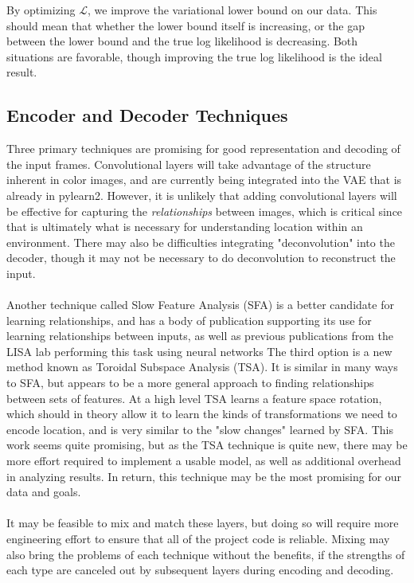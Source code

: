 \documentclass{article}
\begin{document}
 By optimizing $\mathcal{L}$, we improve the variational lower bound on our
 data. This should mean that whether the lower bound itself is increasing, or
 the gap between the lower bound and the true log likelihood is decreasing.
 Both situations are favorable, though improving the true log likelihood
 is the ideal result.

\subsection*{Encoder and Decoder Techniques}
Three primary techniques are promising for good representation and decoding
of the input frames. Convolutional layers will take advantage of the structure
inherent in color images, and are currently being integrated into the VAE that
is already in pylearn2. However, it is unlikely that adding convolutional layers
will be effective for capturing the \emph{relationships} between images, 
which is critical since that is ultimately what is necessary for understanding
location within an environment. There may also be difficulties integrating
"deconvolution" into the decoder, though it may not be necessary to do 
deconvolution to reconstruct the input.
\paragraph{}
Another technique called Slow Feature
Analysis (SFA) \cite{sfa} is a better candidate for learning relationships, and has a body
of publication supporting its use for learning relationships between inputs, as
well as previous publications from the LISA lab performing this task using
neural networks %
The third option is a new method known as Toroidal Subspace Analysis \cite{tsa}(TSA). It
is similar in many ways to SFA, but appears to be a more general approach to 
finding relationships between sets of features. At a high level TSA learns a
feature space rotation, which should in theory allow it to learn the kinds of
transformations we need to encode location, and is very similar to the
"slow changes" learned by SFA. This work seems quite promising, but as the TSA
technique is quite new, there may be more effort required to
implement a usable model, as well as additional overhead in analyzing results.
In return, this technique may be the most promising for our data and goals.
\paragraph{}
It may be feasible to mix and match these layers, but doing so will
require more engineering effort to ensure that all of the project code is
reliable. Mixing may also bring the problems of each technique
without the benefits, if the strengths of each type are canceled out by
subsequent layers during encoding and decoding.
\end{document}
